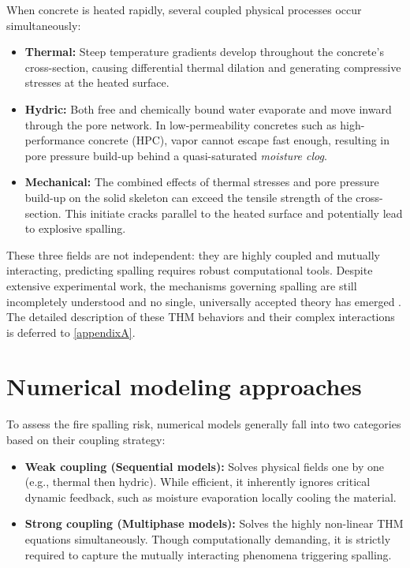 When concrete is heated rapidly, several coupled physical processes occur simultaneously:

\begin{itemize}
    \item \textbf{Thermal:} Steep temperature gradients develop throughout the concrete's cross-section, causing differential thermal dilation and generating compressive stresses at the heated surface.
    
    \item \textbf{Hydric:} Both free and chemically bound water evaporate and move inward through the pore network. In low-permeability concretes such as high-performance concrete (HPC), vapor cannot escape fast enough, resulting in pore pressure build-up behind a quasi-saturated \textit{moisture clog}.
    
    \item \textbf{Mechanical:} The combined effects of thermal stresses and pore pressure build-up on the solid skeleton can exceed the tensile strength of the cross-section. This initiate cracks parallel to the heated surface and potentially lead to explosive spalling.
\end{itemize}

These three fields are not independent: they are highly coupled and mutually interacting, predicting spalling requires robust computational tools. Despite extensive experimental work, the mechanisms governing spalling are still incompletely understood and no single, universally accepted theory has emerged \cite{dauti2018}. The detailed description of these THM behaviors and their complex interactions is deferred to \cref{appendixA}.

\section{Numerical modeling approaches}
To assess the fire spalling risk, numerical models generally fall into two categories based on their coupling strategy:
\begin{itemize}
    \item \textbf{Weak coupling (Sequential models):} Solves physical fields one by one (e.g., thermal then hydric). While efficient, it inherently ignores critical dynamic feedback, such as moisture evaporation locally cooling the material.
    \item \textbf{Strong coupling (Multiphase models):} Solves the highly non-linear THM equations simultaneously. Though computationally demanding, it is strictly required to capture the mutually interacting phenomena triggering spalling.
\end{itemize}

